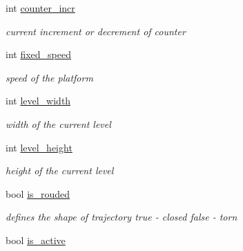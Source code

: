 \begin{DoxyCompactItemize}
\mbox{\label{class_platform_a36158e28df3d35b04ffa531cde921e48}} 
int \hyperlink{class_platform_a36158e28df3d35b04ffa531cde921e48}{counter\+\_\+incr}
\begin{DoxyCompactList}\small\item\em current increment or decrement of counter \end{DoxyCompactList}\item 
\mbox{\label{class_platform_a03da0eb526cdf8ae29cdc626b07fcf3e}} 
int \hyperlink{class_platform_a03da0eb526cdf8ae29cdc626b07fcf3e}{fixed\+\_\+speed}
\begin{DoxyCompactList}\small\item\em speed of the platform \end{DoxyCompactList}\item 
\mbox{\label{class_platform_ac9eacf4c7c58d649be944b94ffeeb7b5}} 
int \hyperlink{class_platform_ac9eacf4c7c58d649be944b94ffeeb7b5}{level\+\_\+width}
\begin{DoxyCompactList}\small\item\em width of the current level \end{DoxyCompactList}\item 
\mbox{\label{class_platform_a180664b41270365d3be526b48fa2567b}} 
int \hyperlink{class_platform_a180664b41270365d3be526b48fa2567b}{level\+\_\+height}
\begin{DoxyCompactList}\small\item\em height of the current level \end{DoxyCompactList}\item 
\mbox{\label{class_platform_ab3e380bb3ba10bb3ab5c58e0d37f9095}} 
bool \hyperlink{class_platform_ab3e380bb3ba10bb3ab5c58e0d37f9095}{is\+\_\+rouded}
\begin{DoxyCompactList}\small\item\em defines the shape of trajectory \textquotesingle{}true\textquotesingle{} -\/ closed \textquotesingle{}false\textquotesingle{} -\/ torn \end{DoxyCompactList}\item 
\mbox{\label{class_platform_a3a9d45f38361924cb60ef5b17bef0cac}} 
bool \hyperlink{class_platform_a3a9d45f38361924cb60ef5b17bef0cac}{is\+\_\+active}

\end{DoxyCompactItemize}
